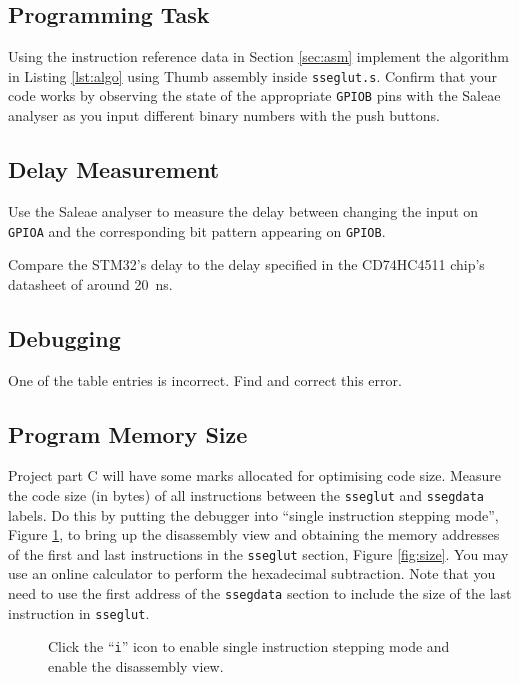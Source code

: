 \documentclass{UoNMCHA}
\numberwithin{equation}{section}
\begin{document}
\subsection{Programming Task}
Using the instruction reference data in Section \ref{sec:asm} implement the algorithm in Listing \ref{lst:algo} using Thumb assembly inside \texttt{sseglut.s}. Confirm that your code works by observing the state of the appropriate \texttt{GPIOB} pins with the Saleae analyser as you input different binary numbers with the push buttons.

\subsection{Delay Measurement}

Use the Saleae analyser to measure the delay between changing the input on \texttt{GPIOA} and the corresponding bit pattern appearing on \texttt{GPIOB}.

Compare the STM32's delay to the delay specified in the CD74HC4511 chip's datasheet of around 20~ns.


\subsection{Debugging}

One of the table entries is incorrect. Find and correct this error.

\subsection{Program Memory Size}

Project part C will have some marks allocated for optimising code size. Measure the code size (in bytes) of all instructions between the \texttt{sseglut} and \texttt{ssegdata} labels. Do this by putting the debugger into ``single instruction stepping mode'', Figure \ref{fig:step}, to bring up the disassembly view and obtaining the memory addresses of the first and last instructions in the \texttt{sseglut} section, Figure \ref{fig:size}. You may use an online calculator to perform the hexadecimal subtraction. Note that you need to use the first address of the \texttt{ssegdata} section to include the size of the last instruction in \texttt{sseglut}.

\begin{figure}[h]
\caption{Click the ``\texttt{i}'' icon to enable single instruction stepping mode and enable the disassembly view.}\label{fig:step}
\end{figure}
\end{document}
